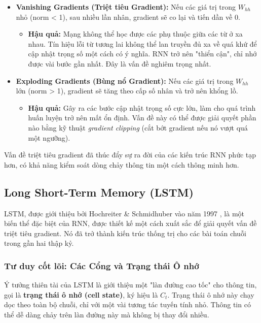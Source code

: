 \begin{itemize}
    \item \textbf{Vanishing Gradients (Triệt tiêu Gradient):} Nếu các giá trị trong $W_{hh}$ nhỏ (norm < 1), sau nhiều lần nhân, gradient sẽ co lại và tiến dần về 0.
        \begin{itemize}
            \item \textbf{Hậu quả:} Mạng không thể học được các phụ thuộc giữa các từ ở xa nhau. Tín hiệu lỗi từ tương lai không thể lan truyền đủ xa về quá khứ để cập nhật trọng số một cách có ý nghĩa. RNN trở nên "thiển cận", chỉ nhớ được vài bước gần nhất. Đây là vấn đề nghiêm trọng nhất.
        \end{itemize}
    \item \textbf{Exploding Gradients (Bùng nổ Gradient):} Nếu các giá trị trong $W_{hh}$ lớn (norm > 1), gradient sẽ tăng theo cấp số nhân và trở nên khổng lồ.
        \begin{itemize}
            \item \textbf{Hậu quả:} Gây ra các bước cập nhật trọng số cực lớn, làm cho quá trình huấn luyện trở nên mất ổn định. Vấn đề này có thể được giải quyết phần nào bằng kỹ thuật \textit{gradient clipping} (cắt bớt gradient nếu nó vượt quá một ngưỡng).
        \end{itemize}
\end{itemize}

Vấn đề triệt tiêu gradient đã thúc đẩy sự ra đời của các kiến trúc RNN phức tạp hơn, có khả năng kiểm soát dòng chảy thông tin một cách thông minh hơn.

\subsection{Long Short-Term Memory (LSTM)}
\label{ssec:lstm}
LSTM, được giới thiệu bởi Hochreiter \& Schmidhuber vào năm 1997 \cite{hochreiter1997long}, là một biến thể đặc biệt của RNN, được thiết kế một cách xuất sắc để giải quyết vấn đề triệt tiêu gradient. Nó đã trở thành kiến trúc thống trị cho các bài toán chuỗi trong gần hai thập kỷ.

\subsubsection{Tư duy cốt lõi: Các Cổng và Trạng thái Ô nhớ}
Ý tưởng thiên tài của LSTM là giới thiệu một "làn đường cao tốc" cho thông tin, gọi là \textbf{trạng thái ô nhớ (cell state)}, ký hiệu là $C_t$. Trạng thái ô nhớ này chạy dọc theo toàn bộ chuỗi, chỉ với một vài tương tác tuyến tính nhỏ. Thông tin có thể dễ dàng chảy trên làn đường này mà không bị thay đổi nhiều.

